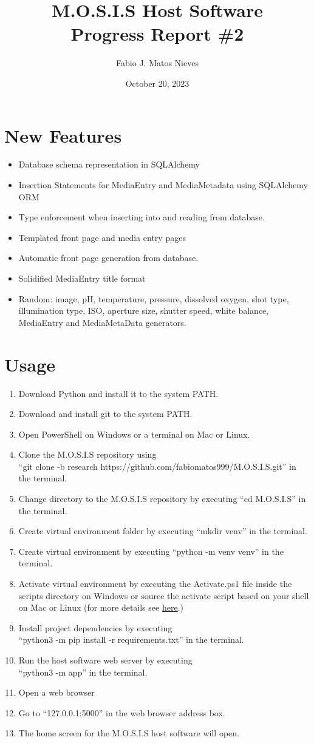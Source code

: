 \documentclass[12pt]{article}
\author{Fabio J. Matos Nieves}
\date{October 20, 2023}
\title{M.O.S.I.S Host Software\\Progress Report \#2}
\begin{document}

\tableofcontents
\newpage
\section{New Features}
\begin{itemize}
\item Database schema representation in SQLAlchemy
\item Insertion Statements for MediaEntry and MediaMetadata using SQLAlchemy ORM
\item Type enforcement when inserting into and reading from database.
\item Templated front page and media entry pages
\item Automatic front page generation from database.
\item Solidified MediaEntry title format
\item Random: image, pH, temperature, pressure, dissolved oxygen, shot type, illumination type, ISO, aperture size, shutter speed, white balance, MediaEntry and MediaMetaData generators.
\end{itemize}
\section{Usage}
\begin{enumerate}
\item Download Python and install it to the system PATH.
\item Download and install git to the system PATH.
  \item Open PowerShell on Windows or a terminal on Mac or Linux.
\item Clone the M.O.S.I.S repository using\\ ``git clone -b research https://github.com/fabiomatos999/M.O.S.I.S.git'' in the terminal.
\item Change directory to the M.O.S.I.S repository by executing ``cd M.O.S.I.S'' in the terminal.
\item Create virtual environment folder by executing ``mkdir venv'' in the terminal.
\item Create virtual environment by executing ``python -m venv venv'' in the terminal.
\item Activate virtual environment by executing the Activate.ps1 file inside the scripts directory on Windows or source the activate script based on your shell on Mac or Linux (for more details see \href{https://docs.python.org/3/library/venv.html#how-venvs-work}{here}.)
\item Install project dependencies by executing\\ ``python3 -m pip install -r requirements.txt'' in the terminal.
\item Run the host software web server by executing\\ ``python3 -m app'' in the terminal.
\item Open a web browser
\item Go to ``127.0.0.1:5000'' in the web browser address box.
\item The home screen for the M.O.S.I.S host software will open.
\end{enumerate}
\appendix
\end{document}
